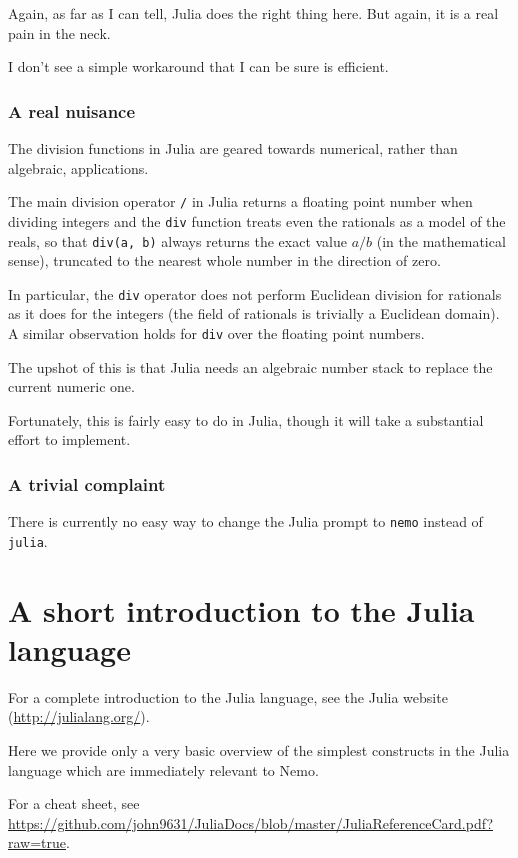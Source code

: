 \documentclass[a4paper,10pt]{article}
\newcommand{\code}{\lstinline}
\begin{document}
Again, as far as I can tell, Julia does the right thing here. But again, it is a real pain in the neck.

I don't see a simple workaround that I can be sure is efficient.

\subsubsection{A real nuisance}

The division functions in Julia are geared towards numerical, rather than algebraic, applications.

The main division operator \code{/} in Julia returns a floating point number when dividing integers
and the \code{div} function treats even the rationals as a model of the reals, so that \code{div(a, b)}
always returns the exact value $a/b$ (in the mathematical sense), truncated to the nearest whole
number in the direction of zero.

In particular, the \code{div} operator does not perform Euclidean division for rationals as it does
for the integers (the field of rationals is trivially a Euclidean domain). A similar observation holds
for \code{div} over the floating point numbers.

The upshot of this is that Julia needs an algebraic number stack to replace the current numeric one.

Fortunately, this is fairly easy to do in Julia, though it will take a substantial effort to implement. 

\subsubsection{A trivial complaint}

There is currently no easy way to change the Julia prompt to \code{nemo} instead of \code{julia}.

\section{A short introduction to the Julia language}

For a complete introduction to the Julia language, see the Julia website (\url{http://julialang.org/}).

Here we provide only a very basic overview of the simplest constructs in the Julia language which are
immediately relevant to Nemo.

For a cheat sheet, see \url{https://github.com/john9631/JuliaDocs/blob/master/JuliaReferenceCard.pdf?raw=true}.
\end{document}
